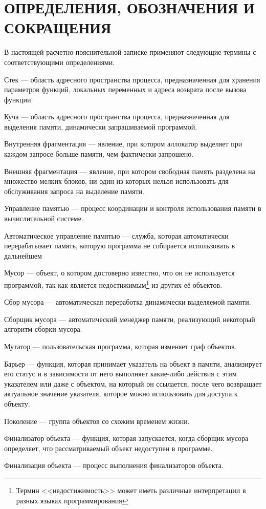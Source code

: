 \part*{ОПРЕДЕЛЕНИЯ, ОБОЗНАЧЕНИЯ И\\СОКРАЩЕНИЯ}
В настоящей расчетно-пояснительной записке применяют следующие термины с соответствующими определениями.

\begin{enumdescript}
	\item[Стек] --- область адресного пространства процесса, предназначенная для хранения параметров функций, локальных переменных и адреса возврата после вызова функции.
	\item[Куча] --- область адресного пространства процесса, предназначенная для выделения памяти, динамически запрашиваемой программой.
	\item[Внутренняя фрагментация] --- явление, при котором аллокатор выделяет при каждом запросе больше памяти, чем фактически запрошено.
	\item[Внешняя фрагментация] --- явление, при котором свободная память разделена на множество мелких блоков, ни один из которых нельзя использовать для обслуживания запроса на выделение памяти.
	\item[Управление памятью] --- процесс координации и контроля использования памяти в вычислительной системе.
	\item[Автоматическое управление памятью] --- служба, которая автоматически перерабатывает память, которую программа не собирается использовать в дальнейшем
	\item[Мусор] --- объект, о котором достоверно известно, что он не используется программой, так как является недостижимым\footnote{Термин <<недостижимость>> может иметь различные интерпретации в разных языках программирования} из других её объектов.
	\item[Сбор мусора] --- автоматическая переработка динамически выделяемой памяти.
	\item[Сборщик мусора] --- автоматический менеджер памяти, реализующий некоторый алгоритм сборки мусора.
	\item[Мутатор] --- пользовательская программа, которая изменяет граф объектов.
	\item[Барьер] --- функция, которая принимает указатель на объект в памяти, анализирует его статус и в зависимости от него выполняет какие-либо действия с этим указателем или даже с объектом, на который он ссылается, после чего возвращает актуальное значение указателя, которое можно использовать для доступа к объекту.
	\item[Поколение] --- группа объектов со схожим временем жизни.
	\item[Финализатор объекта] --- функция, которая запускается, когда сборщик мусора определяет, что рассматриваемый объект недоступен в программе.
	\item[Финализация объекта] --- процесс выполнения финализаторов объекта.
\end{enumdescript}
